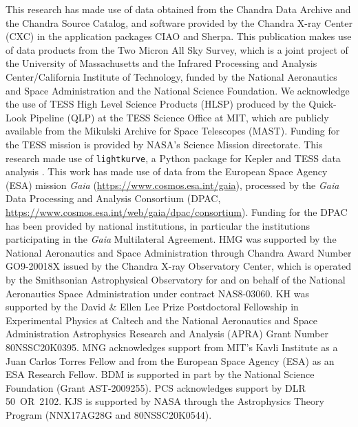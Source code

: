 \documentclass[linenumbers]{aastex631}
\begin{document}
\begin{acknowledgements}
This research has made use of data obtained from the Chandra Data Archive and the Chandra Source Catalog, and software provided by the Chandra X-ray Center (CXC) in the application packages CIAO and Sherpa. This publication makes use of data products from the Two Micron All Sky Survey, which is a joint project of the University of Massachusetts and the Infrared Processing and Analysis Center/California Institute of Technology, funded by the National Aeronautics and Space Administration and the National Science Foundation. 
We acknowledge the use of TESS High Level Science Products (HLSP) produced by the Quick-Look Pipeline (QLP) at the TESS Science Office at MIT, which are publicly available from the Mikulski Archive for Space Telescopes (MAST). Funding for the TESS mission is provided by NASA's Science Mission directorate. This research made use of \texttt{lightkurve}, a Python package for Kepler and TESS data analysis \citep{lightkurve}.
This work has made use of data from the European Space Agency (ESA) mission {\it Gaia} (\url{https://www.cosmos.esa.int/gaia}), processed by the {\it Gaia} Data Processing and Analysis Consortium (DPAC, \url{https://www.cosmos.esa.int/web/gaia/dpac/consortium}). Funding for the DPAC has been provided by national institutions, in particular the institutions participating in the {\it Gaia} Multilateral Agreement.
HMG was supported by the National Aeronautics and Space Administration through Chandra Award Number GO9-20018X issued by the Chandra X-ray Observatory Center, which is operated by the Smithsonian Astrophysical Observatory for and on behalf of the National Aeronautics Space Administration under contract NAS8-03060.
KH was supported by the David {\&} Ellen Lee Prize Postdoctoral Fellowship in Experimental Physics at Caltech and the National Aeronautics and Space Administration Astrophysics Research and Analysis (APRA) Grant Number 80NSSC20K0395.
MNG acknowledges support from MIT's Kavli Institute as a Juan Carlos Torres Fellow and from the European Space Agency (ESA) as an ESA Research Fellow. 
BDM is supported in part by the National Science Foundation (Grant AST-2009255). 
PCS acknowledges support by DLR 50~OR~2102. 
KJS is supported by NASA through the Astrophysics Theory Program (NNX17AG28G and 80NSSC20K0544).
\end{acknowledgements}



{}



\end{document}
